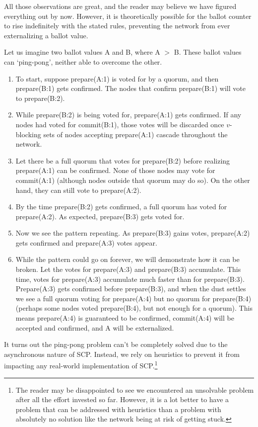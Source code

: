 All those observations are great, and the reader may believe we have figured everything out by now. However, it is theoretically possible for the ballot counter to rise indefinitely with the stated rules, preventing the network from ever externalizing a ballot value.

Let us imagine two ballot values A and B, where A $>$ B. These ballot values can `ping-pong', neither able to overcome the other.

\begin{enumerate}
    \item To start, suppose prepare(A:1) is voted for by a quorum, and then prepare(B:1) gets confirmed. The nodes that confirm prepare(B:1) will vote to prepare(B:2).

    \item While prepare(B:2) is being voted for, prepare(A:1) gets confirmed. If any nodes had voted for commit(B:1), those votes will be discarded once $v$-blocking sets of nodes accepting prepare(A:1) cascade throughout the network.

    \item Let there be a full quorum that votes for prepare(B:2) before realizing prepare(A:1) can be confirmed. None of those nodes may vote for commit(A:1) (although nodes outside that quorum may do so). On the other hand, they can still vote to prepare(A:2).

    \item By the time prepare(B:2) gets confirmed, a full quorum has voted for prepare(A:2). As expected, prepare(B:3) gets voted for.

    \item Now we see the pattern repeating. As prepare(B:3) gains votes, prepare(A:2) gets confirmed and prepare(A:3) votes appear.

    \item While the pattern could go on forever, we will demonstrate how it can be broken. Let the votes for prepare(A:3) and prepare(B:3) accumulate. This time, votes for prepare(A:3) accumulate much faster than for prepare(B:3). Prepare(A:3) gets confirmed before prepare(B:3), and when the dust settles we see a full quorum voting for prepare(A:4) but no quorum for prepare(B:4) (perhaps some nodes voted prepare(B:4), but not enough for a quorum). This means prepare(A:4) is guaranteed to be confirmed, commit(A:4) will be accepted and confirmed, and A will be externalized.
\end{enumerate}

It turns out the ping-pong problem can't be completely solved due to the asynchronous nature of SCP. Instead, we rely on heuristics to prevent it from impacting any real-world implementation of SCP.\footnote{The reader may be disappointed to see we encountered an unsolvable problem after all the effort invested so far. However, it is a lot better to have a problem that can be addressed with heuristics than a problem with absolutely no solution like the network being at risk of getting stuck.}

